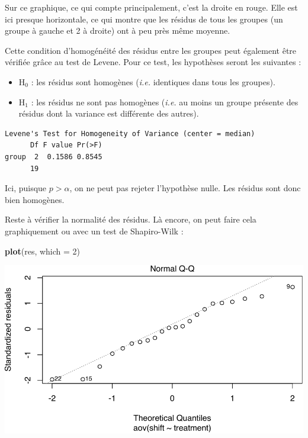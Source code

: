 \documentclass[
  a4paper,
]{article}
\newenvironment{Shaded}{\begin{snugshade}}{\end{snugshade}}
\newcommand{\DataTypeTok}[1]{\textcolor[rgb]{0.00,0.34,0.68}{#1}}
\newcommand{\DecValTok}[1]{\textcolor[rgb]{0.69,0.50,0.00}{#1}}
\newcommand{\KeywordTok}[1]{\textcolor[rgb]{0.12,0.11,0.11}{\textbf{#1}}}
\newcommand{\NormalTok}[1]{\textcolor[rgb]{0.12,0.11,0.11}{#1}}
\newcommand{\OperatorTok}[1]{\textcolor[rgb]{0.12,0.11,0.11}{#1}}
\newcommand{\StringTok}[1]{\textcolor[rgb]{0.75,0.01,0.01}{#1}}
\providecommand{\tightlist}{%
  \setlength{\itemsep}{0pt}\setlength{\parskip}{0pt}}
\begin{document}
Sur ce graphique, ce qui compte principalement, c'est la droite en rouge. Elle est ici presque horizontale, ce qui montre que les résidus de tous les groupes (un groupe à gauche et 2 à droite) ont à peu près même moyenne.

Cette condition d'homogénéité des résidus entre les groupes peut également être vérifiée grâce au test de Levene. Pour ce test, les hypothèses seront les suivantes :

\begin{itemize}
\tightlist
\item
  H\(_0\) : les résidus sont homogènes (\emph{i.e.} identiques dans tous les groupes).
\item
  H\(_1\) : les résidus ne sont pas homogènes (\emph{i.e.} au moins un groupe présente des résidus dont la variance est différente des autres).
\end{itemize}

\begin{Shaded}
\end{Shaded}

\begin{verbatim}
Levene's Test for Homogeneity of Variance (center = median)
      Df F value Pr(>F)
group  2  0.1586 0.8545
      19               
\end{verbatim}

Ici, puisque \(p > \alpha\), on ne peut pas rejeter l'hypothèse nulle. Les résidus sont donc bien homogènes.

Reste à vérifier la normalité des résidus. Là encore, on peut faire cela graphiquement ou avec un test de Shapiro-Wilk :

\begin{Shaded}
\begin{Highlighting}[]
\KeywordTok{plot}\NormalTok{(res, }\DataTypeTok{which =} \DecValTok{2}\NormalTok{)}
\end{Highlighting}
\end{Shaded}

\begin{center}\includegraphics[width=0.9\linewidth]{figure/unnamed-chunk-83-1} \end{center}
\end{document}
